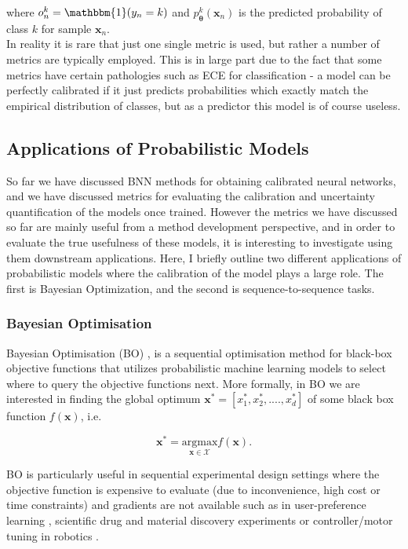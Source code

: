 \noindent where $o_n^k = \mathbbm{1}(y_n = k)$ and $p^k_{\bm{\theta}}(\mathbf{x}_{n})$ is the predicted probability of class $k$ for sample $\mathbf{x}_n$. \\

\noindent In reality it is rare that just one single metric is used, but rather a number of metrics are typically employed. This is in large part due to the fact that some metrics have certain pathologies such as ECE for classification - a model can be perfectly calibrated if it just predicts probabilities which exactly match the empirical distribution of classes, but as a predictor this model is of course useless.

\subsection{Applications of Probabilistic Models}
\label{sec:apps_probmodels}
So far we have discussed BNN methods for obtaining calibrated neural networks, and we have discussed metrics for evaluating the calibration and uncertainty quantification of the models once trained. However the metrics we have discussed so far are mainly useful from a method development perspective, and in order to evaluate the true usefulness of these models, it is interesting to investigate using them downstream applications. Here, I briefly outline two different applications of probabilistic models where the calibration of the model plays a large role. The first is Bayesian Optimization, and the second is sequence-to-sequence tasks.

\subsubsection*{Bayesian Optimisation}
\label{sec:BO}
Bayesian Optimisation (BO) \citep{2012_BO, deFreitas_BO}, is a sequential optimisation method for black-box objective functions that utilizes probabilistic machine learning models to select where to query the objective functions next. More formally, in BO we are interested in finding the global optimum $\mathbf{x}^* = [x_1^*, x_2^*, ...., x_d^*]$ of some black box function $f(\mathbf{x})$, i.e.

\begin{equation}
    \mathbf{x}^* = \underset{\mathbf{x}\in \mathcal{X}}{\text{argmax}} f(\mathbf{x}).
\end{equation}

\noindent BO is particularly useful in sequential experimental design settings where the objective function is expensive to evaluate (due to inconvenience, high cost or time constraints) and gradients are not available such as in user-preference learning \citep{BO_hearingaids, gonzalez_preferencelearning}, scientific drug and material discovery experiments \citep{Kim2021DeepLF, BOforDrugDesign} or controller/motor tuning in robotics \citep{pmlr-v70-akrour17a,brunzema_controller}. \\


